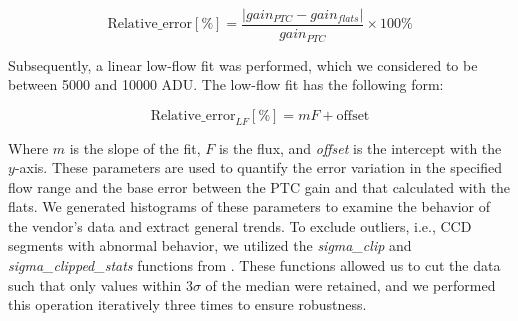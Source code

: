 \begin{equation}
    \mbox{Relative\_error} [\%] = \frac{|gain_{PTC} - gain_{flats}|}{gain_{PTC}} \times 100 \% 
    \label{eq:error_relativo_gain}
\end{equation}

Subsequently, a linear low-flow fit was performed, which we considered to be between 5000 and 10000 ADU. The low-flow fit has the following form:

\begin{equation}
    \mbox{Relative\_error}_{LF} [\%] = m F + \mbox{offset}
\end{equation}

Where $m$ is the slope of the fit, $F$ is the flux, and \textit{offset} is the intercept with the $y$-axis. These parameters are used to quantify the error variation in the specified flow range and the base error between the PTC gain and that calculated with the flats. We generated histograms of these parameters to examine the behavior of the vendor's data and extract general trends. To exclude outliers, i.e., CCD segments with abnormal behavior, we utilized the \textit{sigma\_clip} and \textit{sigma\_clipped\_stats} functions from \cite{2018AJ....156..123A}. These functions allowed us to cut the data such that only values within $3 \sigma$ of the median were retained, and we performed this operation iteratively three times to ensure robustness.


